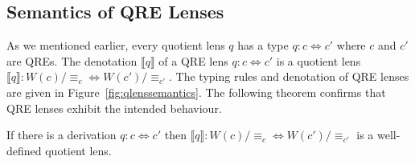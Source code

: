 \documentclass{svproc}
\newcommand{\eqrel}[1]{\ensuremath{\equiv_{#1}}}
\begin{document}
\subsection{Semantics of QRE Lenses}
As we mentioned earlier, every quotient lens $q$ has a type $q :
c \Longleftrightarrow c'$ where $c$ and $c'$ are QREs. The denotation
$\llbracket q \rrbracket$ of a QRE lens $q:c \Leftrightarrow c'$ is a quotient
lens $\llbracket q \rrbracket : W(c)/{\eqrel{c}} \Longleftrightarrow
W(c')/{\eqrel{c'}}$. The typing rules and denotation of QRE lenses are given in
Figure~\ref{fig:qlenssemantics}. The following theorem confirms that QRE lenses
exhibit the intended behaviour.

\begin{theorem}
  If there is a derivation $q:c \Leftrightarrow c'$ then
  $\llbracket q \rrbracket : W(c)/\eqrel{c} \Leftrightarrow W(c')/\eqrel{c'}$ is a
  well-defined quotient lens.
\end{theorem}
\end{document}

